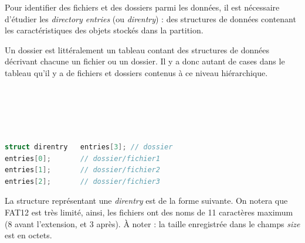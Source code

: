 \documentclass[11pt,a4paper]{article}
\begin{document}

Pour identifier des fichiers et des dossiers parmi les données, il est nécessaire d'étudier les \textit{directory entries} (ou \textit{direntry}) : des structures de données contenant les caractéristiques des objets stockés dans la partition.


Un dossier est littéralement un tableau contant des structures de données décrivant chacune un fichier ou un dossier.
Il y a donc autant de cases dans le tableau qu'il y a de fichiers et dossiers contenus à ce niveau hiérarchique.

\medskip

\begin{table}[ht!]
  \centering
  \begin{minipage}{0.3\textwidth}

\noindent {} \\
 \\
 \\
 \\

  \end{minipage}
  \hfillx
  \begin{minipage}{0.6\textwidth}

\begin{lstlisting}[language=C,commentstyle=\color{commentgreen}]
struct direntry   entries[3]; // dossier
entries[0];       // dossier/fichier1
entries[1];       // dossier/fichier2
entries[2];       // dossier/fichier3 \end{lstlisting}

  \end{minipage}
\end{table}

\newpage

La structure représentant une \textit{direntry} est de la forme suivante.
On notera que FAT12 est très limité, ainsi, les fichiers ont des noms de 11 caractères maximum (8 avant l'extension, et 3 après).
\`A noter : la taille enregistrée dans le champs \textit{size} est en octets.
\end{document}
